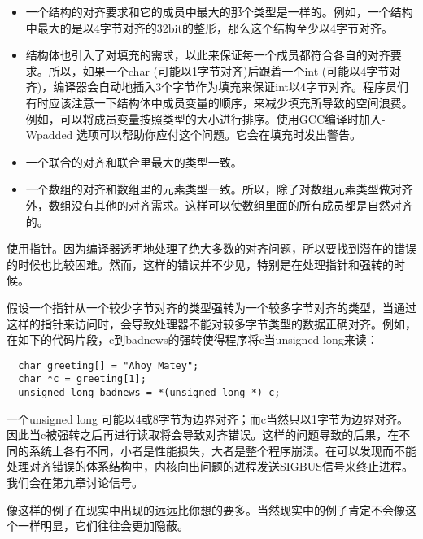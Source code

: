 \begin{itemize}
\item \begin{flushleft}一个结构的对齐要求和它的成员中最大的那个类型是一样的。例如，一个结构中最大的是以4字节对齐的32bit的整形，那么这个结构至少以4字节对齐。\end{flushleft}
\item \begin{flushleft}结构体也引入了对填充的需求，以此来保证每一个成员都符合各自的对齐要求。所以，如果一个char (可能以1字节对齐)后跟着一个int (可能以4字节对齐)，编译器会自动地插入3个字节作为填充来保证int以4字节对齐。程序员们有时应该注意一下结构体中成员变量的顺序，来减少填充所导致的空间浪费。例如，可以将成员变量按照类型的大小进行排序。使用GCC编译时加入-Wpadded 选项可以帮助你应付这个问题。它会在填充时发出警告。\end{flushleft}
\item \begin{flushleft}一个联合的对齐和联合里最大的类型一致。 \end{flushleft}
\item \begin{flushleft}一个数组的对齐和数组里的元素类型一致。所以，除了对数组元素类型做对齐外，数组没有其他的对齐需求。这样可以使数组里面的所有成员都是自然对齐的。\end{flushleft}
\end{itemize}

  使用指针。因为编译器透明地处理了绝大多数的对齐问题，所以要找到潜在的错误的时候也比较困难。然而，这样的错误并不少见，特别是在处理指针和强转的时候。

假设一个指针从一个较少字节对齐的类型强转为一个较多字节对齐的类型，当通过这样的指针来访问时，会导致处理器不能对较多字节类型的数据正确对齐。例如，在如下的代码片段，c到badnews的强转使得程序将c当unsigned long来读： 

\begin{lstlisting}
  char greeting[] = "Ahoy Matey";
  char *c = greeting[1];
  unsigned long badnews = *(unsigned long *) c;
\end{lstlisting}

一个unsigned long 可能以4或8字节为边界对齐；而c当然只以1字节为边界对齐。因此当c被强转之后再进行读取将会导致对齐错误。这样的问题导致的后果，在不同的系统上各有不同，小者是性能损失，大者是整个程序崩溃。在可以发现而不能处理对齐错误的体系结构中，内核向出问题的进程发送SIGBUS信号来终止进程。我们会在第九章讨论信号。

像这样的例子在现实中出现的远远比你想的要多。当然现实中的例子肯定不会像这个一样明显，它们往往会更加隐蔽。 


